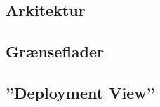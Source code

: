 \documentclass[../main.tex]{subfiles}
\begin{document}
\subsection{Arkitektur}



\subsection{Grænseflader}


\subsection{”Deployment View”}
 
 
 
\end{document}
